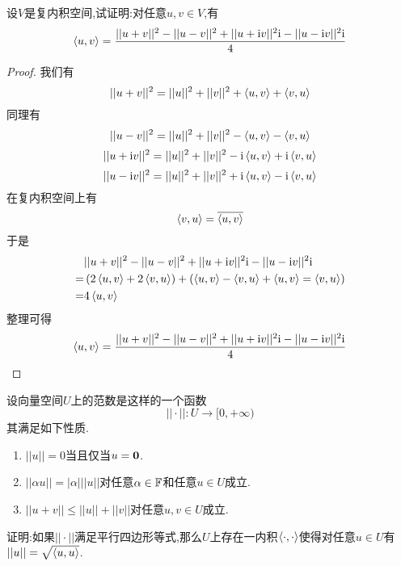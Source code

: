 \documentclass{ctexart}
\begin{document}
\begin{problem}[27.]
    设$V$是复内积空间,试证明:对任意$u,v\in V$,有
    \[\left\langle{u},{v}\right\rangle=\dfrac{||u+v||^2-||u-v||^2+||u+\text{i} v||^2\text{i}-||u-\text{i} v||^2\text{i}}{4}\]
\end{problem}
\begin{proof}
    我们有
    \[||u+v||^2=||u||^2+||v||^2+\left\langle{u},{v}\right\rangle+\left\langle{v},{u}\right\rangle\]
    同理有
    \[||u-v||^2=||u||^2+||v||^2-\left\langle{u},{v}\right\rangle-\left\langle{v},{u}\right\rangle\]
    \[||u+\text{i} v||^2=||u||^2+||v||^2-\text{i}\left\langle{u},{v}\right\rangle+\text{i}\left\langle{v},{u}\right\rangle\]
    \[||u-\text{i} v||^2=||u||^2+||v||^2+\text{i}\left\langle{u},{v}\right\rangle-\text{i}\left\langle{v},{u}\right\rangle\]
    在复内积空间上有
    \[\left\langle{v},{u}\right\rangle=\overline{\left\langle{u},{v}\right\rangle}\]
    于是
    \[\begin{aligned}
        &||u+v||^2-||u-v||^2+||u+\text{i} v||^2\text{i}-||u-\text{i} v||^2\text{i}\\
        =&\left(2\left\langle{u},{v}\right\rangle+2\left\langle{v},{u}\right\rangle\right)+\left(\left\langle{u},{v}\right\rangle-\left\langle{v},{u}\right\rangle+\left\langle{u},{v}\right\rangle=\left\langle{v},{u}\right\rangle\right) \\
        =&4\left\langle{u},{v}\right\rangle
    \end{aligned}\]
    整理可得
    \[\left\langle{u},{v}\right\rangle=\dfrac{||u+v||^2-||u-v||^2+||u+\text{i} v||^2\text{i}-||u-\text{i} v||^2\text{i}}{4}\]
\end{proof}
\begin{problem}[28.]
    设向量空间$U$上的范数是这样的一个函数
    \[||\cdot||:U\to[0,+\infty)\]
    其满足如下性质.
    \begin{enumerate}[label=\tbf{(\arabic*)}]
        \item $||u||=0$当且仅当$u=\mathbf0$.
        \item $||\alpha u||=|\alpha|||u||$对任意$\alpha\in\mathbb{F}$和任意$u\in U$成立.
        \item $||u+v||\leqslant||u||+||v||$对任意$u,v\in U$成立.
    \end{enumerate}
    证明:如果$||\cdot||$满足平行四边形等式,那么$U$上存在一内积$\left\langle{\cdot},{\cdot}\right\rangle$使得对任意$u\in U$有$||u||=\sqrt{\left\langle{u},{u}\right\rangle}$.
\end{problem}
\end{document}
